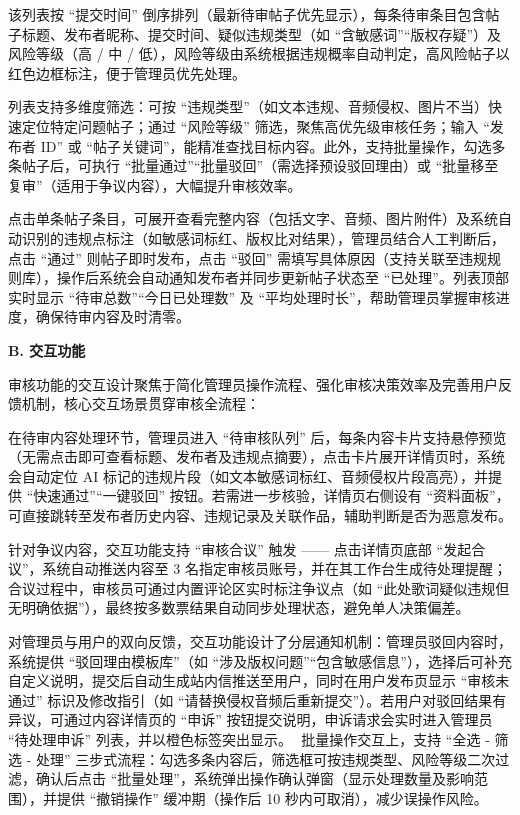 \documentclass{base}
\numberwithin{figure}{section} %
\begin{document}
该列表按 “提交时间” 倒序排列（最新待审帖子优先显示），每条待审条目包含帖子标题、发布者昵称、提交时间、疑似违规类型（如 “含敏感词”“版权存疑”）及风险等级（高 / 中 / 低），风险等级由系统根据违规概率自动判定，高风险帖子以红色边框标注，便于管理员优先处理。

列表支持多维度筛选：可按 “违规类型”（如文本违规、音频侵权、图片不当）快速定位特定问题帖子；通过 “风险等级” 筛选，聚焦高优先级审核任务；输入 “发布者 ID” 或 “帖子关键词”，能精准查找目标内容。此外，支持批量操作，勾选多条帖子后，可执行 “批量通过”“批量驳回”（需选择预设驳回理由）或 “批量移至复审”（适用于争议内容），大幅提升审核效率。

点击单条帖子条目，可展开查看完整内容（包括文字、音频、图片附件）及系统自动识别的违规点标注（如敏感词标红、版权比对结果），管理员结合人工判断后，点击 “通过” 则帖子即时发布，点击 “驳回” 需填写具体原因（支持关联至违规规则库），操作后系统会自动通知发布者并同步更新帖子状态至 “已处理”。列表顶部实时显示 “待审总数”“今日已处理数” 及 “平均处理时长”，帮助管理员掌握审核进度，确保待审内容及时清零。

\textbf{B. 交互功能}

审核功能的交互设计聚焦于简化管理员操作流程、强化审核决策效率及完善用户反馈机制，核心交互场景贯穿审核全流程：​

在待审内容处理环节，管理员进入 “待审核队列” 后，每条内容卡片支持悬停预览（无需点击即可查看标题、发布者及违规点摘要），点击卡片展开详情页时，系统会自动定位 AI 标记的违规片段（如文本敏感词标红、音频侵权片段高亮），并提供 “快速通过”“一键驳回” 按钮。若需进一步核验，详情页右侧设有 “资料面板”，可直接跳转至发布者历史内容、违规记录及关联作品，辅助判断是否为恶意发布。​

针对争议内容，交互功能支持 “审核合议” 触发 —— 点击详情页底部 “发起合议”，系统自动推送内容至 3 名指定审核员账号，并在其工作台生成待处理提醒；合议过程中，审核员可通过内置评论区实时标注争议点（如 “此处歌词疑似违规但无明确依据”），最终按多数票结果自动同步处理状态，避免单人决策偏差。​

对管理员与用户的双向反馈，交互功能设计了分层通知机制：管理员驳回内容时，系统提供 “驳回理由模板库”（如 “涉及版权问题”“包含敏感信息”），选择后可补充自定义说明，提交后自动生成站内信推送至用户，同时在用户发布页显示 “审核未通过” 标识及修改指引（如 “请替换侵权音频后重新提交”）。若用户对驳回结果有异议，可通过内容详情页的 “申诉” 按钮提交说明，申诉请求会实时进入管理员 “待处理申诉” 列表，并以橙色标签突出显示。
​
批量操作交互上，支持 “全选 - 筛选 - 处理” 三步式流程：勾选多条内容后，筛选框可按违规类型、风险等级二次过滤，确认后点击 “批量处理”，系统弹出操作确认弹窗（显示处理数量及影响范围），并提供 “撤销操作” 缓冲期（操作后 10 秒内可取消），减少误操作风险。​
\end{document}

